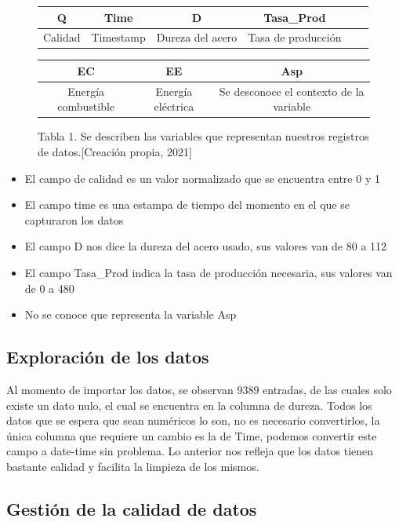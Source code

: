 \documentclass{article}
\begin{document}
\begin{figure}[ht]
\hfill
\begin{tabular}{|c|c|c|c|c|c|}
\hline
Q & Time & D & Tasa\_Prod\\
\hline
Calidad &
Timestamp &
Dureza del acero &
Tasa de producción \\
\hline
\end{tabular}

\begin{tabular}{|c|c|c|}
    \hline
     EC & EE &Asp  \\
     \hline
Energía combustible &
Energía eléctrica &
Se desconoce el contexto de la variable\\
\hline
\end{tabular}


\caption{Tabla 1. Se describen las variables que representan nuestros registros de datos.[Creación propia, 2021]}
\label{Tabla 1}
\end{figure}

\begin{itemize}
    \item El campo de calidad es un valor normalizado que se encuentra entre 0 y 1
    \item El campo time es una estampa de tiempo del momento en el que se capturaron los datos
    \item El campo D nos dice la dureza del acero usado, sus valores van de 80 a 112
    \item El campo Tasa\_Prod indica la tasa de producción necesaria, sus valores van de 0 a 480
    \item No se conoce que representa la variable Asp
\end{itemize}


\subsection{Exploración de los datos}\label{edd}
Al momento de importar los datos, se observan 9389 entradas, de las cuales solo existe un dato nulo, el cual se encuentra en la columna de dureza. Todos los datos que se espera que sean numéricos lo son, no es necesario convertirlos, la única columna que requiere un cambio es la de Time, podemos convertir este campo a date-time sin problema. Lo anterior nos refleja que los datos tienen bastante calidad y facilita la limpieza de los mismos. 



\subsection{Gestión de la calidad de datos}\label{cdd}
\end{document}
